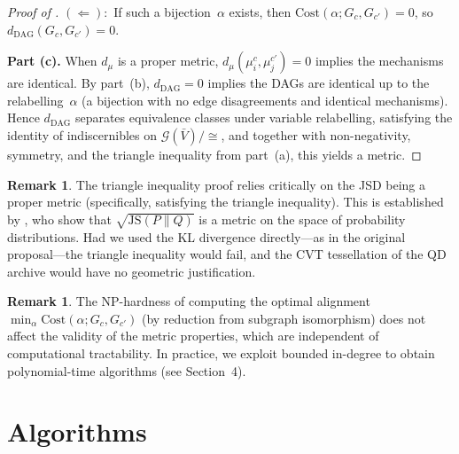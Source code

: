 \documentclass[11pt,a4paper]{article}
\theoremstyle{definition}
\newtheorem{remark}[theorem]{Remark}
\newcommand{\Vbar}{\bar{V}}                   %
\newcommand{\JS}{\mathrm{JS}}                 %
\newcommand{\Cost}{\mathrm{Cost}}             %
\newcommand{\dDAG}{d_{\mathrm{DAG}}}          %
\newcommand{\dmu}{d_{\mu}}                    %
\begin{document}
\begin{proof}[Proof of ]
$(\Leftarrow)$:\ If such a bijection~$\alpha$ exists, then
$\Cost(\alpha; G_c, G_{c'}) = 0$, so $\dDAG(G_c, G_{c'}) = 0$.

\medskip
\textbf{Part (c).}
When $\dmu$ is a proper metric, $\dmu(\mu_i^c, \mu_j^{c'}) = 0$ implies
the mechanisms are identical.  By part~(b), $\dDAG = 0$ implies the DAGs
are identical up to the relabelling~$\alpha$ (a bijection with no edge
disagreements and identical mechanisms).  Hence $\dDAG$ separates
equivalence classes under variable relabelling, satisfying the identity of
indiscernibles on $\mathcal{G}(\Vbar)/{\cong}$, and together with
non-negativity, symmetry, and the triangle inequality from part~(a), this
yields a metric.
\end{proof}

\begin{remark}
The triangle inequality proof relies critically on the JSD being a proper
metric (specifically, satisfying the triangle inequality).  This is
established by \citet{endres2003new}, who show that $\sqrt{\JS(P \| Q)}$
is a metric on the space of probability distributions.  Had we used the KL
divergence directly---as in the original proposal---the triangle inequality
would fail, and the CVT tessellation of the QD archive would have no
geometric justification.
\end{remark}

\begin{remark}
The NP-hardness of computing the optimal alignment
$\min_\alpha \Cost(\alpha; G_c, G_{c'})$ (by reduction from subgraph
isomorphism) does not affect the validity of the metric properties, which
are independent of computational tractability.  In practice, we exploit
bounded in-degree to obtain polynomial-time algorithms (see Section~4).
\end{remark}



% 



\section{Algorithms}\label{sec:algorithms}
\end{document}
